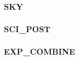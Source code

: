 \documentclass{pz_thesis}
\begin{document}
\subsubsection{SKY}

\subsubsection{SCI\_POST}

\subsubsection{EXP\_COMBINE}

%
%
%




{\footnotesize}
\end{document}
